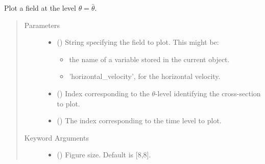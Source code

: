 \documentclass[letterpaper,10pt,english]{sphinxmanual}
\begin{document}
\begin{fulllineitems}
\begin{fulllineitems}
\begin{quote}
\begin{description}
\begin{itemize}
\end{itemize}

\end{description}\end{quote}

\end{fulllineitems}


\begin{fulllineitems}
\label{\detokenize{api:storages.state_isentropic.StateIsentropic.contourf_xy}}
Plot a field at the level \(\theta = \bar{\theta}\).
\begin{quote}\begin{description}
\item[{Parameters}] \leavevmode\begin{itemize}
\item {} 
 () \textendash{} 
String specifying the field to plot. This might be:
\begin{itemize}
\item {} 
the name of a variable stored in the current object.

\item {} 
’horizontal\_velocity’, for the horizontal velocity.

\end{itemize}


\item {} 
 () \textendash{} Index corresponding to the \(\theta\)-level identifying the cross-section to plot.

\item {} 
 () \textendash{} The index corresponding to the time level to plot.

\end{itemize}

\item[{Keyword Arguments}] \leavevmode\begin{itemize}
\item {} 
 () \textendash{} Figure size. Default is {[}8,8{]}.


\end{itemize}
\end{description}
\end{quote}
\end{fulllineitems}
\end{fulllineitems}
\end{document}
